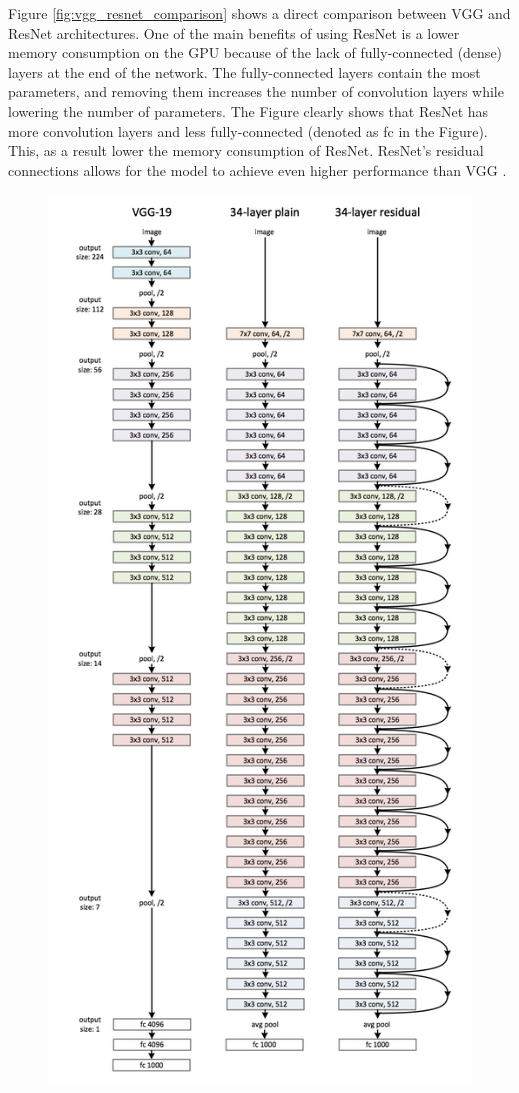 \documentclass[times, utf8, diplomski]{fer}
\begin{document}
Figure \ref{fig:vgg_resnet_comparison} shows a direct comparison between VGG \citep{simonyan_very_2014} and ResNet architectures. One of the main benefits of using ResNet is a lower memory consumption on the GPU because of the lack of fully-connected (dense) layers at the end of the network. The fully-connected layers contain the most parameters, and removing them increases the number of convolution layers while lowering the number of parameters. The Figure clearly shows that ResNet has more convolution layers and less fully-connected (denoted as fc in the Figure). This, as a result lower the memory consumption of ResNet. ResNet's residual connections allows for the model to achieve even higher performance than VGG \citep{he_deep_2016}.

\begin{figure}
  \includegraphics[scale=0.7]{figures/resnet_vgg_comparison.png}

\end{figure}
\end{document}
